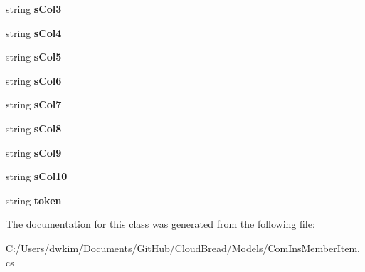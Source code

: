 \begin{DoxyCompactItemize}
\item 
string {\bfseries s\+Col3}\hypertarget{a00050_a6d118c807c67dce2519cef93182cde6d}{}\label{a00050_a6d118c807c67dce2519cef93182cde6d}

\item 
string {\bfseries s\+Col4}\hypertarget{a00050_a074dbc97546bd52450c3bd5f02c33b3b}{}\label{a00050_a074dbc97546bd52450c3bd5f02c33b3b}

\item 
string {\bfseries s\+Col5}\hypertarget{a00050_a07230909913209aba745d7d1781133ca}{}\label{a00050_a07230909913209aba745d7d1781133ca}

\item 
string {\bfseries s\+Col6}\hypertarget{a00050_a7f0d3da2225c9b548793032b689565fb}{}\label{a00050_a7f0d3da2225c9b548793032b689565fb}

\item 
string {\bfseries s\+Col7}\hypertarget{a00050_acbde63908c1e4a5cc9efd1928da567d1}{}\label{a00050_acbde63908c1e4a5cc9efd1928da567d1}

\item 
string {\bfseries s\+Col8}\hypertarget{a00050_aeb2e71724ca86a5d67e552786fe04c1f}{}\label{a00050_aeb2e71724ca86a5d67e552786fe04c1f}

\item 
string {\bfseries s\+Col9}\hypertarget{a00050_a098da9f0b275b3e50697f163f178d615}{}\label{a00050_a098da9f0b275b3e50697f163f178d615}

\item 
string {\bfseries s\+Col10}\hypertarget{a00050_ab469be670b36bb9e673d133acfe2b083}{}\label{a00050_ab469be670b36bb9e673d133acfe2b083}

\item 
string {\bfseries token}\hypertarget{a00050_aa8ea89fdb59f0edae810cbfa28fbb5e2}{}\label{a00050_aa8ea89fdb59f0edae810cbfa28fbb5e2}

\end{DoxyCompactItemize}


The documentation for this class was generated from the following file\+:\begin{DoxyCompactItemize}
\item 
C\+:/\+Users/dwkim/\+Documents/\+Git\+Hub/\+Cloud\+Bread/\+Models/Com\+Ins\+Member\+Item.\+cs\end{DoxyCompactItemize}

